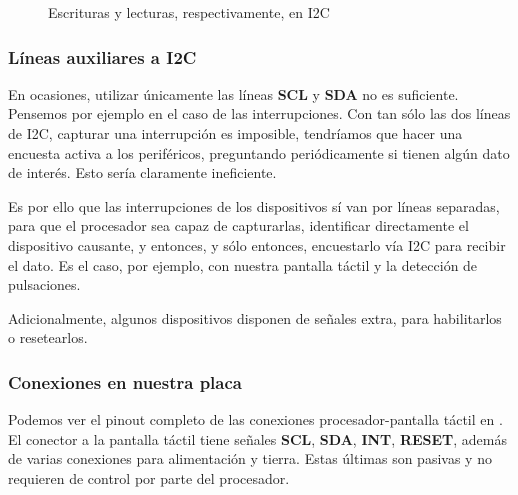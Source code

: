 \documentclass[../main.tex]{subfiles}
\begin{document}
\begin{figure}[h!]
{%
                }
                \caption{Escrituras y lecturas, respectivamente, en I2C}
                \label{fig:i2c_read_write}
            \end{figure}
                    
        \subsubsection{Líneas auxiliares a I2C}

            En ocasiones, utilizar únicamente las líneas \textbf{SCL} y \textbf{SDA} no es suficiente. Pensemos por ejemplo en el caso de las interrupciones. Con tan sólo las dos líneas de I2C, capturar una interrupción es imposible, tendríamos que hacer una encuesta activa a los periféricos, preguntando periódicamente si tienen algún dato de interés. Esto sería claramente ineficiente.

            Es por ello que las interrupciones de los dispositivos sí van por líneas separadas, para que el procesador sea capaz de capturarlas, identificar directamente el dispositivo causante, y entonces, y sólo entonces, encuestarlo vía I2C para recibir el dato. Es el caso, por ejemplo, con nuestra pantalla táctil y la detección de pulsaciones.

            Adicionalmente, algunos dispositivos disponen de señales extra, para habilitarlos o resetearlos.

        \subsubsection{Conexiones en nuestra placa}

            Podemos ver el pinout completo de las conexiones procesador-pantalla táctil en \BRDMAN[6.8]. El conector a la pantalla táctil tiene señales \textbf{SCL}, \textbf{SDA}, \textbf{INT}, \textbf{RESET}, además de varias conexiones para alimentación y tierra. Estas últimas son pasivas y no requieren de control por parte del procesador.
\end{document}
